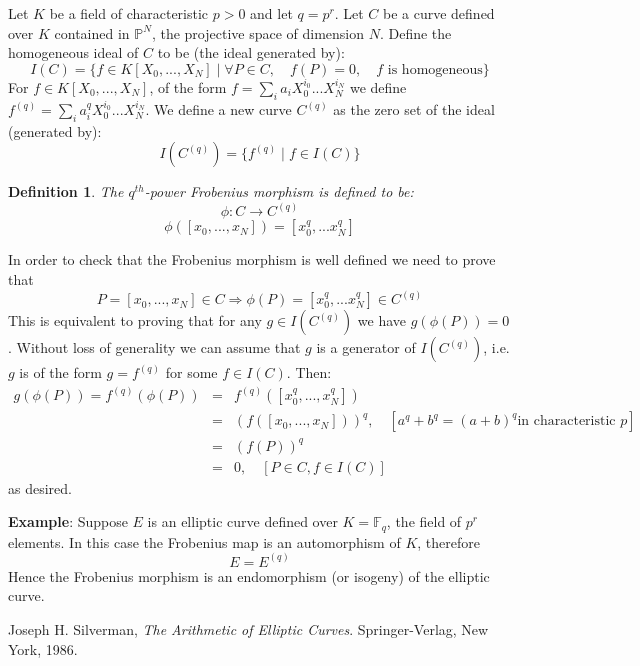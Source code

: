 \documentclass[12pt]{article}
\newtheorem{defn}{Definition}
\begin{document}
Let $K$ be a field of characteristic $p>0$ and let $q=p^r$. Let
$C$ be a curve defined over $K$ contained in $\mathbb{P}^N$, the
projective space of dimension $N$. Define the homogeneous ideal of
$C$ to be (the ideal generated by):
$$I(C)=\{f\in K[X_0,...,X_N] \mid \forall P \in C,\quad f(P)=0,\quad f\text{ is homogeneous}\}$$
For $f\in K[X_0,...,X_N]$, of the form $f=\sum_i
a_iX_0^{i_0}...X_N^{i_N}$ we define $f^{(q)}=\sum_i
a_i^qX_0^{i_0}...X_N^{i_N}$. We define a new curve $C^{(q)}$ as
the zero set of the ideal (generated by):
$$I(C^{(q)})=\{f^{(q)}\mid f\in I(C)\}$$

\begin{defn}
The $q^{th}$-power Frobenius morphism is defined to be:
$$\phi\colon C\to C^{(q)}$$
$$\phi([x_0,...,x_N])=[x_0^q,...x_N^q]$$
\end{defn}

In order to check that the Frobenius morphism is well defined we
need to prove that $$P=[x_0,...,x_N]\in C \Rightarrow
\phi(P)=[x_0^q,...x_N^q]\in C^{(q)}$$ This is equivalent to
proving that for any $g \in I(C^{(q)})$ we have $g(\phi(P))=0$.
Without loss of generality we can assume that $g$ is a generator
of $I(C^{(q)})$, i.e. $g$ is of the form $g=f^{(q)}$ for some
$f\in I(C)$. Then:
\begin{eqnarray*}
g(\phi(P))=f^{(q)}(\phi(P)) &=& f^{(q)}([x_0^q,...,x_N^q])\\
&=& (f([x_0,...,x_N]))^q,\quad [a^q+b^q=(a+b)^q \text{in characteristic $p$}] \\
&=& (f(P))^q\\
&=& 0,\quad [P\in C, f\in I(C)]
\end{eqnarray*}
as desired.

{\bf Example}: Suppose $E$ is an elliptic curve defined over
$K=\mathbb{F}_q$, the field of $p^r$ elements. In this case the
Frobenius map is an automorphism of $K$, therefore
$$E=E^{(q)}$$ Hence the Frobenius morphism is an endomorphism (or
isogeny) of the elliptic curve.

\begin{thebibliography}{9}
 Joseph H. Silverman, {\em The Arithmetic of Elliptic Curves}. Springer-Verlag, New York, 1986.
\end{thebibliography}
\end{document}
